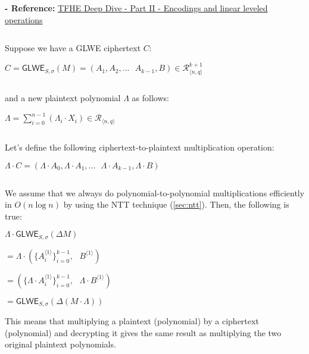 \textbf{- Reference:} 
\href{https://www.zama.ai/post/tfhe-deep-dive-part-2}{TFHE Deep Dive - Part II - Encodings and linear leveled operations}~\cite{tfhe-2}

$ $

Suppose we have a GLWE ciphertext $C$:

$C = \textsf{GLWE}_{S, \sigma}(M) = ( A_1, A_2, ... \text{ } A_{k-1}, B) \in \mathcal{R}_{\langle n,q \rangle}^{k + 1}$

$ $

\noindent and a new plaintext polynomial $\Lambda$ as follows: 

$\Lambda = \sum\limits_{i=0}^{n-1}(\Lambda_i \cdot X_i) \in \mathcal{R}_{\langle n, q \rangle}$

$ $

\noindent Let's define the following ciphertext-to-plaintext multiplication operation:

$\Lambda \cdot C = (\Lambda \cdot A_0, \Lambda \cdot A_1, ... \text{ } \Lambda \cdot A_{k-1}, \Lambda \cdot B)$

$ $

\noindent We assume that we always do polynomial-to-polynomial multiplications efficiently in $O(n \log n)$ by using the NTT technique (\autoref{sec:ntt}). Then, the following is true: 

\begin{tcolorbox}[title={\textbf{\tboxlabel{\ref*{sec:glwe-mult-plain}} GLWE Ciphertext-to-Plaintext Multiplication}}]
$\Lambda \cdot \textsf{GLWE}_{S, \sigma}(\Delta M)$

$= \Lambda \cdot (\{A_i^{\langle 1 \rangle}\}_{i=0}^{k-1}, \text{ } B^{\langle 1 \rangle})$

$= (\{\Lambda\cdot A_i^{\langle 1 \rangle}\}_{i=0}^{k-1}, \text{ } \Lambda \cdot B^{\langle 1 \rangle})$

$= \textsf{GLWE}_{S, \sigma}(\Delta (M \cdot \Lambda) )$
\end{tcolorbox}

This means that multiplying a plaintext (polynomial) by a ciphertext (polynomial) and decrypting it gives the same result as multiplying the two original plaintext polynomials.  

$ $

